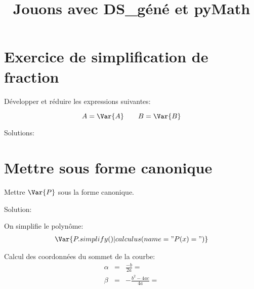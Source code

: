 \documentclass[a4paper,10pt]{article}
\title{Jouons avec DS\_géné et pyMath}
\date{}
\begin{document}
\maketitle

\section{Exercice de simplification de fraction}
		Développer et réduire les expressions suivantes:

		\begin{equation*}
            A = \Var{ A } \qquad
            B = \Var{ B }
		\end{equation*}

        Solutions:

\section{Mettre sous forme canonique}
    Mettre $\Var{P}$ sous la forme canonique.

    Solution:

    On simplifie le polynôme:
    \begin{eqnarray*}
        \Var{P.simplify() | calculus(name = "P(x) = ")}
    \end{eqnarray*}
    

    Calcul des coordonnées du sommet de la courbe:
    \begin{eqnarray*}
        \alpha & = & \frac{-b}{2a} =  \\
        \beta & = & -\frac{b^2 - 4ac}{4a} = 
    \end{eqnarray*}
    
\end{document}
